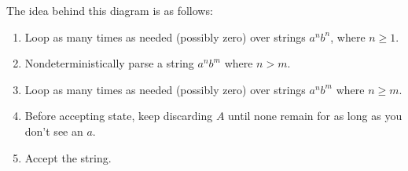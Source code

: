\documentclass[11pt]{article}
\begin{document}
The idea behind this diagram is as follows:
\begin{enumerate}
\item Loop as many times as needed (possibly zero) over strings $a^nb^n$, where
$n \geq 1$.
\item Nondeterministically parse a string $a^nb^m$ where $n > m$.
\item Loop as many times as needed (possibly zero) over strings $a^nb^m$ where
$n \geq m$.
\item Before accepting state, keep discarding $A$ until none remain for as long as
you don't see an $a$.
\item Accept the string.
\end{enumerate}
\end{document}
